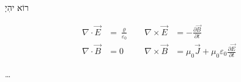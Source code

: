 \documentclass[preview,border=1cm]{standalone}
\begin{document}
\andgodsaid

\begin{center}
{\ezr\huge רוֹא יהִיְ}
\end{center}

\whichmeans

\begin{align*}
\nabla \cdot \vec{E} &= \frac{\varrho}{\varepsilon_0}
\quad & \nabla \times \vec{E} &= - \frac{\partial \vec{B}}{\partial t} \\
\nabla \cdot \vec{B} &= 0
\quad & \nabla \times \vec{B} &= \mu_{0}\vec{J}
+ \mu_{0}\varepsilon_{0}\frac{\partial \vec{E}}{\partial t}
\end{align*}

\begin{flushright}
\dots{} \andtherewaslight
\end{flushright}
\end{document}
